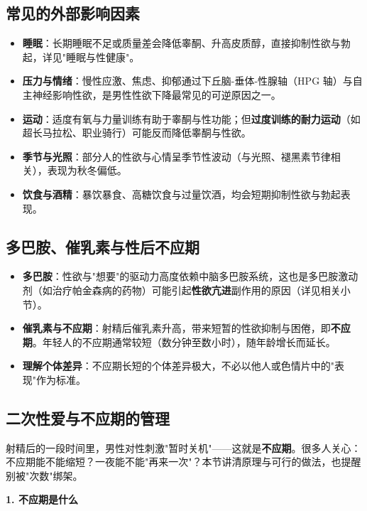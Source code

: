 \subsection{常见的外部影响因素}

\begin{itemize}
	\item \textbf{睡眠}：长期睡眠不足或质量差会降低睾酮、升高皮质醇，直接抑制性欲与勃起，详见"睡眠与性健康"。
	\item \textbf{压力与情绪}：慢性应激、焦虑、抑郁通过下丘脑-垂体-性腺轴（HPG 轴）与自主神经影响性欲，是男性性欲下降最常见的可逆原因之一。
	\item \textbf{运动}：适度有氧与力量训练有助于睾酮与性功能；但\textbf{过度训练的耐力运动}（如超长马拉松、职业骑行）可能反而降低睾酮与性欲。
	\item \textbf{季节与光照}：部分人的性欲与心情呈季节性波动（与光照、褪黑素节律相关），表现为秋冬偏低。
	\item \textbf{饮食与酒精}：暴饮暴食、高糖饮食与过量饮酒，均会短期抑制性欲与勃起表现。
\end{itemize}

\subsection{多巴胺、催乳素与性后不应期}

\begin{itemize}
	\item \textbf{多巴胺}：性欲与"想要"的驱动力高度依赖中脑多巴胺系统，这也是多巴胺激动剂（如治疗帕金森病的药物）可能引起\textbf{性欲亢进}副作用的原因（详见相关小节）。
	\item \textbf{催乳素与不应期}：射精后催乳素升高，带来短暂的性欲抑制与困倦，即\textbf{不应期}。年轻人的不应期通常较短（数分钟至数小时），随年龄增长而延长。
	\item \textbf{理解个体差异}：不应期长短的个体差异极大，不必以他人或色情片中的"表现"作为标准。
\end{itemize}

\subsection{二次性爱与不应期的管理}

射精后的一段时间里，男性对性刺激"暂时关机"——这就是\textbf{不应期}。很多人关心：不应期能不能缩短？一夜能不能"再来一次"？本节讲清原理与可行的做法，也提醒别被"次数"绑架。

\vspace{0.5em}
\noindent\textbf{1. 不应期是什么}

